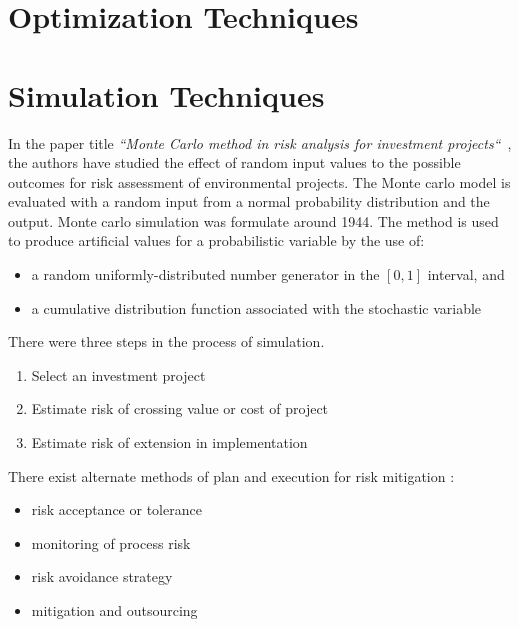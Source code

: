 \section{Optimization Techniques} 
\label{optimization-techniques}

%
%
%
%

\setlength{\footskip}{8mm}

\section{Simulation Techniques} 
\label{visualization-techniques}

In the paper title \textit{``Monte Carlo method in risk analysis for investment projects``}~, the authors have studied the effect of random input values to the possible outcomes for risk assessment of environmental projects. The Monte carlo model is evaluated with a random input from a normal probability distribution and the output. 
Monte carlo simulation was formulate around 1944. The method is used to produce artificial values for a probabilistic variable by the use of:
\begin{itemize}
	\item a random uniformly-distributed number generator in the $ [0,1] $ interval, and
	\item a cumulative distribution function associated with the stochastic variable
\end{itemize} 
There were three steps in the process of simulation. 
\begin{enumerate}
	\item Select an investment project
	\item Estimate risk of crossing value or cost of project
	\item Estimate risk of extension in implementation
\end{enumerate}
There exist alternate methods of plan and execution for risk mitigation :
\begin{itemize}
	\item risk acceptance or tolerance
	\item monitoring of process risk
	\item risk avoidance strategy
	\item mitigation and outsourcing
\end{itemize}

%
%
%
%

\setlength{\footskip}{8mm}

